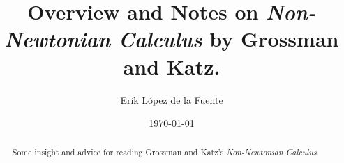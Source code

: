 \documentclass[a4paper, titlepage]{article}
\title{Overview and Notes on \textit{Non-Newtonian Calculus} by Grossman and Katz.}
\author{Erik López de la Fuente}
\date{\today}
\begin{document}
\maketitle

\begin{abstract}
	Some insight and advice for reading Grossman and Katz's \textit{Non-Newtonian Calculus}.
\end{abstract}

\tableofcontents
\newpage






\nocite{*}


\end{document}

